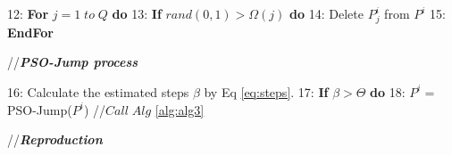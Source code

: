 \documentclass[lettersize,journal]{IEEEtran}
\begin{document}
\begin{algorithm}[t]
\begin{small}
\begin{algorithmic}[0]
				
				\STATE \hspace{-0.3cm} {\small 12:} \hspace{-0.05cm}  \hspace{0.25cm} \textbf{For} $j=1\;to\;Q$ \textbf{do} 	
				\STATE \hspace{-0.3cm} {\small 13:} \hspace{-0.05cm}  \hspace{0.5cm} \textbf{If} $rand(0,1)>\Omega(j)$ \textbf{do} 	
				\STATE \hspace{-0.3cm} {\small 14:} \hspace{-0.05cm}  \hspace{0.75cm} Delete $P^i_j$ from $P^i$
				\STATE \hspace{-0.3cm} {\small 15:} \hspace{-0.05cm}  \hspace{0.25cm}  \textbf{EndFor}
			\end{algorithmic} 	
			
			//\textbf{{\emph{\textcolor[rgb]{0,0,0}{PSO-Jump process}}}}
			\begin{algorithmic}[0]
				\STATE \hspace{-0.3cm} {\small 16:} \hspace{-0.05cm}  \hspace{0.2cm} Calculate the estimated steps $\beta$ by Eq \ref{eq:steps}.	
				\STATE \hspace{-0.3cm} {\small 17:} \hspace{-0.05cm}  \hspace{0.35cm}\textbf{If} $\beta >  \Theta$   \textbf{do}
				\STATE \hspace{-0.3cm} {\small 18:} \hspace{-0.05cm}  \hspace{0.6cm} $P^{i}=$ PSO-Jump($P^{i}$)  //$Call\;Alg$ \ref{alg:alg3}
			\end{algorithmic} 
			
			//\textbf{{\emph{\textcolor[rgb]{0,0,0}{Reproduction}}}}
			\begin{algorithmic}[0]
				

\end{algorithmic}
\end{small}
\end{algorithm}
\end{document}

